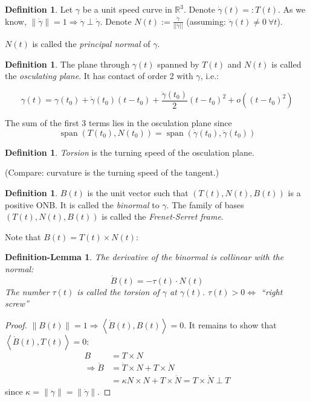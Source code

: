 \documentclass[a4paper,11pt,notitlepage,fullpage]{paper}
\newcommand{\dy}{\dot\gamma}
\newcommand{\ddy}{\ddot\gamma}
\theoremstyle{plain}
\newtheorem{defn-lem}[thm]{Definition-Lemma}
\theoremstyle{definition}
\newtheorem{defn}[thm]{Definition} %
\begin{document}
\begin{defn}
Let $\gamma$ be a unit speed curve in $\mathbb R^3$. Denote $\dy(t) =: T(t)$. As we know, $\left\|\dy\right\| = 1 \Rightarrow \ddy \perp \dy$.
Denote $N(t) := \frac{\ddy}{||\ddy||}$ (assuming: $\ddy(t) \neq 0 ~\forall t$).

$N(t)$ is called the \emph{principal normal} of $\gamma$.
\end{defn}

\begin{defn}
The plane through $\gamma(t)$ spanned by $T(t)$ and $N(t)$ is called the \emph{osculating plane}. It has contact of order 2 with $\gamma$, i.e.:

\[\gamma(t) = \gamma(t_0) + \dy(t_0)(t-t_0) + \frac{\ddy(t_0)}{2}(t-t_0)^2 + o((t-t_0)^2)\]

The sum of the first 3 terms lies in the osculation plane since
\[\operatorname{span}(T(t_0),N(t_0))=\operatorname{span}(\dot{\gamma}(t_0), \ddot{\gamma}(t_0) ) \]
\end{defn}

\begin{defn}
\emph{Torsion} is the turning speed of the osculation plane.
\end{defn}
(Compare: curvature is the turning speed of the tangent.)

\begin{defn}
$B(t)$ is the unit vector such that $(T(t), N(t), B(t))$ is a positive ONB. It is called the \emph{binormal} to $\gamma$. The family of bases $(T(t), N(t), B(t))$ is called the \emph{Frenet-Serret frame}.
\end{defn}
Note that $B(t) = T(t) \times N(t)$:


\begin{defn-lem}
The derivative of the binormal is collinear with the normal:
\[\dot B(t) = -\tau(t) \cdot N(t)\]
The number $\tau(t)$ is called the \emph{torsion} of $\gamma$ at $\gamma(t)$. $\tau(t) > 0 \Leftrightarrow$ ``right screw''
\end{defn-lem}

\begin{proof}
$\left\|B(t)\right\| = 1 \Rightarrow \left\langle\dot B(t), B(t)\right\rangle = 0$. It remains to show that $\left\langle\dot B(t), T(t)\right\rangle = 0$:
\begin{align*}
	B &= T \times N\\
	\Rightarrow\dot B &= \dot T \times N + T\times \dot N \\
	& = \kappa N\times N + T\times \dot N = T\times \dot N \perp T
\end{align*}
since $\kappa=\|\ddot\gamma \|=\|\dot\gamma\|$.
\end{proof}
\end{document}
